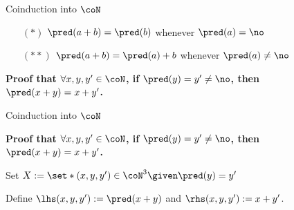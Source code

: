 
\renewcommand{\currentGoal}{$\forall x, y, y' \in \coN$, if $\pred(y) = y' \neq \no$, then $\pred(x + y) = x + y'$}

\begin{frame}[t]{Coinduction into $\coN$} %
  \simpleCoindNBlock

  \begin{itemize}
    \item[$(*)$] {
      $\pred(a + b) = \pred(b)$ whenever $\pred(a) = \no$
    }
    \item[$(**)$] {
      $\pred(a + b) = \pred(a) + b$ whenever $\pred(a) \neq \no$
    }
  \end{itemize}

  \vspace{0.5\baselineskip}

  \par\textbf{Proof that \currentGoal.}
  
\end{frame}

\begin{frame}[t]{Coinduction into $\coN$} %
  \simpleCoindNBlock

  \vspace{0.5 \baselineskip}

  \par\textbf{Proof that \currentGoal.}
  \vspace{0.5\baselineskip}
  \par Set $X := \set*{(x, y, y') \in \coN^3 \given \pred(y) = y' }$
  \vspace{0.5\baselineskip}
  \par Define $\lhs (x, y, y') := \pred(x + y)$ and $\rhs (x, y, y') := x + y'$.
  
\end{frame}




